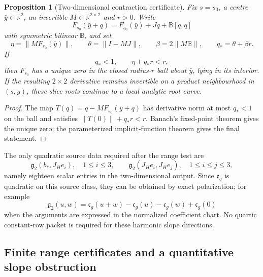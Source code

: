 \documentclass[11pt]{article}
\numberwithin{equation}{section}
\newtheorem{proposition}[proposition]{Proposition}
\theoremstyle{definition}
\theoremstyle{remark}
\begin{document}
\begin{proposition}[Two-dimensional contraction certificate]
\label{prop:supp-exact-slope-contraction}
Fix $s=s_0$, a centre $\bar y\in\mathbb R^2$, an invertible
$M\in\mathbb R^{2\times2}$ and $r>0$.  Write
\begin{equation}
 F_{s_0}(\bar y+q)=F_{s_0}(\bar y)+Jq+\mathbb B[q,q]
 \label{eq:supp-exact-slope-quadratic-Taylor}
\end{equation}
with symmetric bilinear $\mathbb B$, and set
\begin{equation}
 \eta=\|MF_{s_0}(\bar y)\|,
 \qquad \theta=\|I-MJ\|,
 \qquad \beta=2\|M\mathbb B\|,
 \qquad q_*=\theta+\beta r.
 \label{eq:supp-exact-slope-contraction-data}
\end{equation}
If
\begin{equation}
 q_*<1,\qquad \eta+q_*r<r,
 \label{eq:supp-exact-slope-contraction-condition}
\end{equation}
then $F_{s_0}$ has a unique zero in the closed radius-$r$ ball about
$\bar y$, lying in its interior.  If the resulting $2\times2$ derivative
remains invertible on a product neighbourhood in $(s,y)$, these slice roots
continue to a local analytic root curve.
\end{proposition}
\begin{proof}
The map $T(q)=q-MF_{s_0}(\bar y+q)$ has derivative norm at most
$q_*<1$ on the ball and satisfies
$\|T(0)\|+q_*r<r$.  Banach's fixed-point theorem gives the unique zero;
the parameterized implicit-function theorem gives the final statement.
\end{proof}

The only quadratic source data required after the range test are
\begin{equation}
 \mathfrak g_2(b_*,J_He_i),\quad 1\le i\le3,
 \qquad
 \mathfrak g_2(J_He_i,J_He_j),\quad1\le i\le j\le3,
 \label{eq:supp-exact-g2-packet}
\end{equation}
namely eighteen scalar entries in the two-dimensional output.  Since
$\mathfrak c_g$ is quadratic on this source class, they can be obtained by
exact polarization; for example
\begin{equation}
 \mathfrak g_2(u,w)
 =\mathfrak c_g(u+w)-\mathfrak c_g(u)-\mathfrak c_g(w)+\mathfrak c_g(0)
 \label{eq:supp-exact-g2-polarization}
\end{equation}
when the arguments are expressed in the normalized coefficient chart.  No
quartic constant-row packet is required for these harmonic slope directions.


\subsection{Finite range certificates and a quantitative slope obstruction}
\label{subsec:supp-finite-range}
\end{document}
